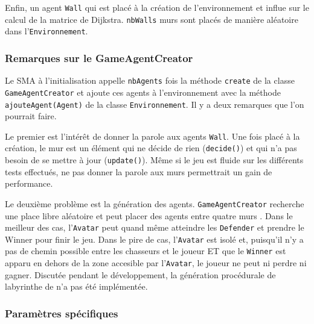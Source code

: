 \documentclass[a4paper]{article}
\begin{document}
\medskip
Enfin, un agent \texttt{Wall} qui est placé à la création de l'environnement et influe sur le calcul de la matrice de Dijkstra. \texttt{nbWalls} murs sont placés de manière aléatoire dans l'\texttt{Environnement}.
\newpage

\subsubsection{Remarques sur le GameAgentCreator}
Le SMA à l'initialisation appelle \texttt{nbAgents} fois la méthode \texttt{create} de la classe \texttt{GameAgentCreator} et ajoute ces agents à l'environnement avec la méthode \texttt{ajouteAgent(Agent)} de la classe \texttt{Environnement}. Il y a deux remarques que l'on pourrait faire.

\medskip
Le premier est l'intérêt de donner la parole aux agents \texttt{Wall}. Une fois placé à la création, le mur est un élément qui ne décide de rien (\texttt{decide()}) et qui n'a pas besoin de se mettre à jour (\texttt{update()}). Même si le jeu est fluide sur les différents tests effectués, ne pas donner la parole aux murs permettrait un gain de performance.

\medskip
Le deuxième problème est la génération des agents. \texttt{GameAgentCreator} recherche une place libre aléatoire et peut placer des agents \og entre quatre murs \fg{}. Dans le meilleur des cas, l'\texttt{Avatar} peut quand même atteindre les \texttt{Defender} et prendre le Winner pour finir le jeu.  Dans le pire de cas, l'\texttt{Avatar} est isolé et, puisqu'il n'y a pas de chemin possible entre les chasseurs et le joueur ET que le \texttt{Winner} est apparu en dehors de la zone accesible par l'\texttt{Avatar}, le joueur ne peut ni perdre ni gagner. Discutée pendant le développement, la génération procédurale de labyrinthe de n'a pas été implémentée.

\subsubsection{Paramètres spécifiques}
\end{document}
